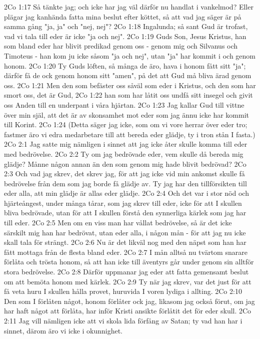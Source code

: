 2Co 1:17  Så tänkte jag; och icke har jag väl därför nu handlat i vankelmod? Eller plägar jag kanhända fatta mina beslut efter köttet, så att vad jag säger är på samma gång "ja, ja" och "nej, nej"?
2Co 1:18  Ingalunda; så sant Gud är trofast, vad vi tala till eder är icke "ja och nej".
2Co 1:19  Guds Son, Jesus Kristus, han som bland eder har blivit predikad genom oss - genom mig och Silvanus och Timoteus - han kom ju icke såsom "ja och nej", utan "ja" har kommit i och genom honom.
2Co 1:20  Ty Guds löften, så många de äro, hava i honom fått sitt "ja"; därför få de ock genom honom sitt "amen", på det att Gud må bliva ärad genom oss.
2Co 1:21  Men den som befäster oss såväl som eder i Kristus, och den som har smort oss, det är Gud,
2Co 1:22  han som har låtit oss undfå sitt insegel och givit oss Anden till en underpant i våra hjärtan.
2Co 1:23  Jag kallar Gud till vittne över min själ, att det är av skonsamhet mot eder som jag ännu icke har kommit till Korint.
2Co 1:24  (Detta säger jag icke, som om vi vore herrar över eder tro; fastmer äro vi edra medarbetare till att bereda eder glädje, ty i tron stån I fasta.)
2Co 2:1  Jag satte mig nämligen i sinnet att jag icke åter skulle komma till eder med bedrövelse.
2Co 2:2  Ty om jag bedrövade eder, vem skulle då bereda mig glädje? Månne någon annan än den som genom mig hade blivit bedrövad?
2Co 2:3  Och vad jag skrev, det skrev jag, för att jag icke vid min ankomst skulle få bedrövelse från dem som jag borde få glädje av. Ty jag har den tillförsikten till eder alla, att min glädje är allas eder glädje.
2Co 2:4  Och det var i stor nöd och hjärteångest, under många tårar, som jag skrev till eder, icke för att I skullen bliva bedrövade, utan för att I skullen förstå den synnerliga kärlek som jag har till eder.
2Co 2:5  Men om en viss man har vållat bedrövelse, så är det icke särskilt mig han har bedrövat, utan eder alla, i någon mån - för att jag nu icke skall tala för strängt.
2Co 2:6  Nu är det likväl nog med den näpst som han har fått mottaga från de flesta bland eder.
2Co 2:7  I mån alltså nu tvärtom snarare förlåta och trösta honom, så att han icke till äventyrs går under genom sin alltför stora bedrövelse.
2Co 2:8  Därför uppmanar jag eder att fatta gemensamt beslut om att bemöta honom med kärlek.
2Co 2:9  Ty när jag skrev, var det just för att få veta huru I skullen hålla provet, huruvida I voren lydiga i allting.
2Co 2:10  Den som I förlåten något, honom förlåter ock jag, likasom jag också förut, om jag har haft något att förlåta, har inför Kristi ansikte förlåtit det för eder skull.
2Co 2:11  Jag vill nämligen icke att vi skola lida förfång av Satan; ty vad han har i sinnet, därom äro vi icke i okunnighet.
